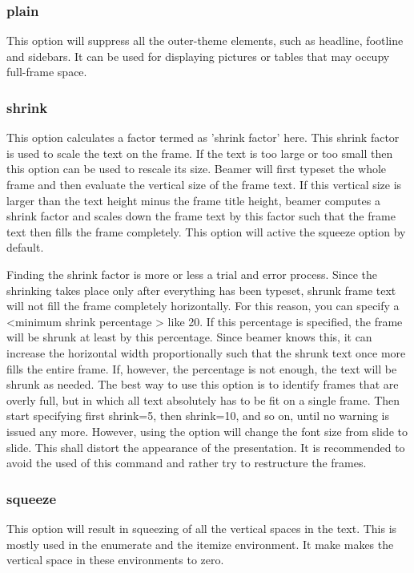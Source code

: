 \subsubsection{{\ttfamily plain}}
This option will suppress all the outer-theme elements, such as headline, footline and sidebars. It can be used for displaying pictures or tables that may occupy full-frame space.

\subsubsection{{\ttfamily shrink}}
This option calculates a factor termed as ’shrink factor’ here. This shrink factor is used to scale the text on the frame. If the text is too large or too small then this option can be used to rescale its size. Beamer will first typeset the whole frame and then evaluate the vertical size of the frame text. If this vertical size is larger than the text height minus the frame title height, beamer computes a shrink factor and scales down the frame text by this factor such that the
frame text then fills the frame completely. This option will active the squeeze option by default.

Finding the shrink factor is more or less a trial and error process. Since the shrinking takes place only after everything has been typeset, shrunk frame text will not fill the frame completely horizontally. For this reason, you can specify a <minimum shrink percentage > like 20. If this percentage is specified, the frame will be shrunk at least by this percentage. Since beamer knows this, it can increase the horizontal width proportionally such that the shrunk text once more fills the entire frame. If, however, the percentage is not enough, the text will be shrunk as needed. The best way to use this option is to identify frames that are overly full, but in which all text absolutely has to be fit on a single frame. Then start specifying first shrink=5, then shrink=10, and so on, until no warning is issued any more. However, using the option will change the font size from slide to slide. This shall distort the appearance of the presentation. It is recommended to avoid the used of this command and rather try to restructure the frames.

\subsubsection{{\ttfamily squeeze}}
This option will result in squeezing of all the vertical spaces in the text. This is mostly used in the enumerate and the itemize environment. It make makes the vertical space in these environments to zero.

